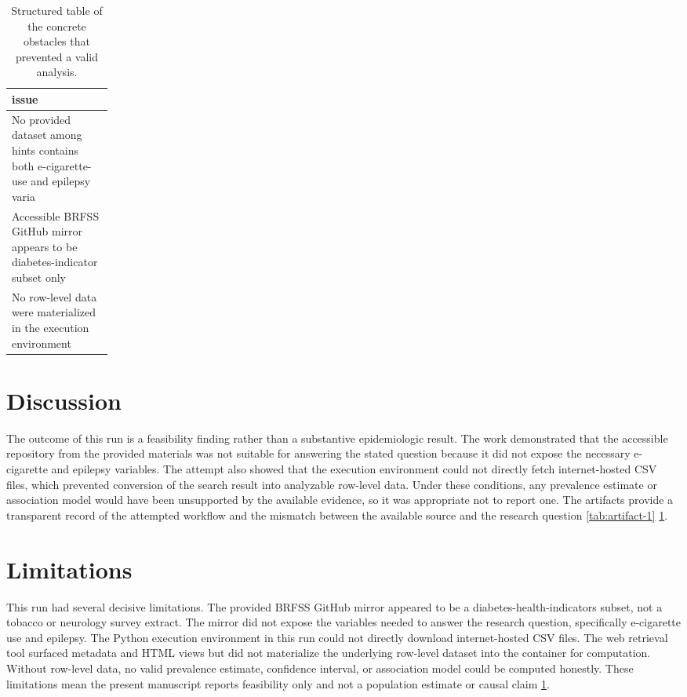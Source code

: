 \documentclass[11pt]{article}
\begin{document}
\begin{table}[tbp]
\centering
\caption{Structured table of the concrete obstacles that prevented a valid analysis.}
\label{tab:artifact-2}
\begin{tabular}{>{\raggedright\arraybackslash}p{0.15\linewidth}}
\toprule
issue \\
\midrule
No provided dataset among hints contains both e-cigarette-use and epilepsy varia \\
Accessible BRFSS GitHub mirror appears to be diabetes-indicator subset only \\
No row-level data were materialized in the execution environment \\
\bottomrule
\end{tabular}
\end{table}

\section{Discussion}
The outcome of this run is a feasibility finding rather than a substantive epidemiologic result. The work demonstrated that the accessible repository from the provided materials was not suitable for answering the stated question because it did not expose the necessary e-cigarette and epilepsy variables. The attempt also showed that the execution environment could not directly fetch internet-hosted CSV files, which prevented conversion of the search result into analyzable row-level data. Under these conditions, any prevalence estimate or association model would have been unsupported by the available evidence, so it was appropriate not to report one. The artifacts provide a transparent record of the attempted workflow and the mismatch between the available source and the research question \cite{ref1} \ref{tab:artifact-1} \ref{tab:artifact-2}.

\section{Limitations}
This run had several decisive limitations. The provided BRFSS GitHub mirror appeared to be a diabetes-health-indicators subset, not a tobacco or neurology survey extract. The mirror did not expose the variables needed to answer the research question, specifically e-cigarette use and epilepsy. The Python execution environment in this run could not directly download internet-hosted CSV files. The web retrieval tool surfaced metadata and HTML views but did not materialize the underlying row-level dataset into the container for computation. Without row-level data, no valid prevalence estimate, confidence interval, or association model could be computed honestly. These limitations mean the present manuscript reports feasibility only and not a population estimate or causal claim \ref{tab:artifact-2}.



\end{document}
